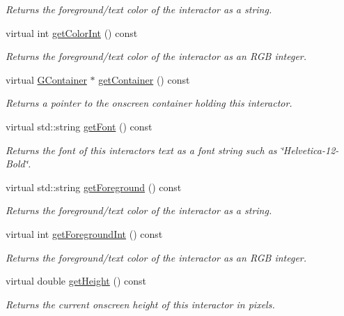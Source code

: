 \begin{DoxyCompactItemize}
\begin{DoxyCompactList}\small\item\em Returns the foreground/text color of the interactor as a string. \end{DoxyCompactList}\item 
virtual int \mbox{\hyperlink{classsgl_1_1GInteractor_a9635c7af766cdc3417f346683fa0e6c1}{get\+Color\+Int}} () const
\begin{DoxyCompactList}\small\item\em Returns the foreground/text color of the interactor as an R\+GB integer. \end{DoxyCompactList}\item 
virtual \mbox{\hyperlink{classsgl_1_1GContainer}{G\+Container}} $\ast$ \mbox{\hyperlink{classsgl_1_1GInteractor_a7a6e317c29d61030929b4cd2d1c00fe7}{get\+Container}} () const
\begin{DoxyCompactList}\small\item\em Returns a pointer to the onscreen container holding this interactor. \end{DoxyCompactList}\item 
virtual std\+::string \mbox{\hyperlink{classsgl_1_1GInteractor_a894a5502900794eeb27d084c21f1d77d}{get\+Font}} () const
\begin{DoxyCompactList}\small\item\em Returns the font of this interactor\textquotesingle{}s text as a font string such as \char`\"{}\+Helvetica-\/12-\/\+Bold\char`\"{}. \end{DoxyCompactList}\item 
virtual std\+::string \mbox{\hyperlink{classsgl_1_1GInteractor_a4fa2d8b0192a3a5b4af4bbfe71194d03}{get\+Foreground}} () const
\begin{DoxyCompactList}\small\item\em Returns the foreground/text color of the interactor as a string. \end{DoxyCompactList}\item 
virtual int \mbox{\hyperlink{classsgl_1_1GInteractor_ac3b12ab385a6ef9ae90fc879860ba726}{get\+Foreground\+Int}} () const
\begin{DoxyCompactList}\small\item\em Returns the foreground/text color of the interactor as an R\+GB integer. \end{DoxyCompactList}\item 
virtual double \mbox{\hyperlink{classsgl_1_1GInteractor_a1e7e353362434072875264cf95629f99}{get\+Height}} () const
\begin{DoxyCompactList}\small\item\em Returns the current onscreen height of this interactor in pixels. \end{DoxyCompactList}\item 

\end{DoxyCompactItemize}
